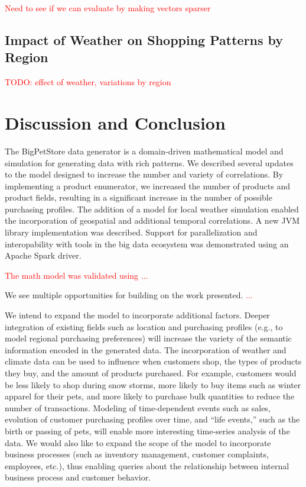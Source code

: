 \documentclass[conference]{IEEEtran}
\begin{document}
\textcolor{red}{Need to see if we can evaluate by making vectors sparser}

\subsection{Impact of Weather on Shopping Patterns by Region}

\textcolor{red}{TODO: effect of weather, variations by region}

\section{Discussion and Conclusion}
The BigPetStore data generator is a domain-driven mathematical model and simulation for generating data with rich patterns.  We described several updates to the model designed to increase the number and variety of correlations.  By implementing a product enumerator, we increased the number of products and product fields, resulting in a significant increase in the number of possible purchasing profiles.  The addition of a model for local weather simulation enabled the incorporation of geospatial and additional temporal correlations.  A new JVM library implementation was described.  Support for parallelization and interopability with tools in the big data ecosystem was demonstrated using an Apache Spark driver.

\textcolor{red}{The math model was validated using ...}

We see multiple opportunities for building on the work presented.  \textcolor{red}{...}

We intend to expand the model to incorporate additional factors.  Deeper integration of existing fields such as location and purchasing profiles (e.g., to model regional purchasing preferences) will increase the variety of the semantic information encoded in the generated data. The incorporation of weather and climate data can be used to influence when customers shop, the types of products they buy, and the amount of products purchased. For example, customers would be less likely to shop during snow storms, more likely to buy items such as winter apparel for their pets, and more likely to purchase bulk quantities to reduce the number of transactions. Modeling of time-dependent events such as sales, evolution of customer purchasing profiles over time, and ``life events,'' such as the birth or passing of pets, will enable more interesting time-series analysis of the data.  We would also like to expand the scope of the model to incorporate business processes (such as inventory management, customer complaints, employees, etc.), thus enabling queries about the relationship between internal business process and customer behavior.
\end{document}
